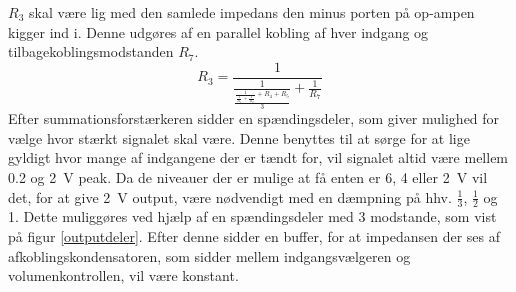 $R_3$ skal være lig med den samlede impedans den minus porten på op-ampen kigger ind i. Denne udgøres af en parallel kobling af hver indgang og tilbagekoblingsmodstanden $R_7$.
\begin{equation}
R_3 = \frac{1}{\frac{1}{\frac{\frac{1}{\frac{1}{R_1}+\frac{1}{R_2}}+R_4+R_5}{3}}+\frac{1}{R_7}}
\end{equation}
Efter summationsforstærkeren sidder en spændingsdeler, som giver mulighed for vælge hvor stærkt signalet skal være. Denne benyttes til  at sørge for at lige gyldigt hvor mange af indgangene der er tændt for, vil signalet altid være mellem 0.2 og 2~V peak. Da de niveauer der er mulige at få enten er 6, 4 eller 2~V vil det, for at give 2~V output, være nødvendigt med en dæmpning på hhv. $\frac{1}{3}$, $\frac{1}{2}$ og 1. Dette muliggøres ved hjælp af en spændingsdeler med 3 modstande, som vist på figur \ref{outputdeler}. Efter denne sidder en buffer, for at impedansen der ses af afkoblingskondensatoren, som sidder mellem indgangsvælgeren og volumenkontrollen, vil være konstant.